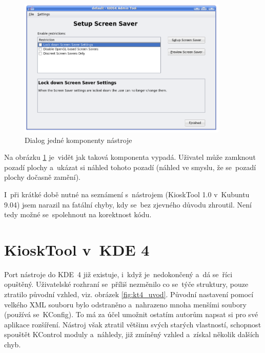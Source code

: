 \begin{figure}[h]
    \centering
    \includegraphics[width=10cm]{obrazky/KioskToolKDE3/ukazka_komponenty.png}
    \caption{Dialog jedné komponenty nástroje}
    \label{fig:kt3_nast_komp}
\end{figure}
Na obrázku \ref{fig:kt3_nast_komp} je~vidět jak taková komponenta vypadá. Uživatel může zamknout pozadí plochy a~ukázat si náhled tohoto pozadí (náhled ve smyslu, že se~pozadí plochy dočasně zamění).

I~při krátké době nutné na seznámení s~nástrojem (KioskTool 1.0 v~Kubuntu 9.04) jsem narazil na fatální chyby, kdy se~bez zjevného důvodu zhroutil. Není tedy možné se~spolehnout na korektnost kódu.

\section{KioskTool v~KDE 4}
Port nástroje do KDE~4 již existuje, i~když je~nedokončený a~dá se~říci opuštěný. Uživatelské rozhraní se~příliš nezměnilo co se~týče struktury, pouze ztratilo původní vzhled, viz. obrázek \ref{fig:kt4_uvod}. Původní nastavení pomocí velkého XML souboru bylo odstraněno a~nahrazeno mnoha menšími soubory (používá se~KConfig). To má za účel umožnit ostatím autorům napsat si pro své aplikace rozšíření. Nástroj však ztratil většinu svých starých vlastností, schopnost spouštět KControl moduly a~náhledy, již zmíněný vzhled a~získal několik dalších chyb.

